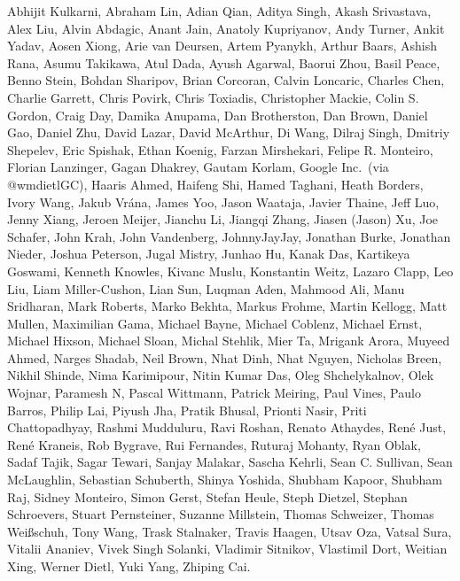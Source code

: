Abhijit Kulkarni,
Abraham Lin,
Adian Qian,
Aditya Singh,
Akash Srivastava,
Alex Liu,
Alvin Abdagic,
Anant Jain,
Anatoly Kupriyanov,
Andy Turner,
Ankit Yadav,
Aosen Xiong,
Arie van Deursen,
Artem Pyanykh,
Arthur Baars,
Ashish Rana,
Asumu Takikawa,
Atul Dada,
Ayush Agarwal,
Baorui Zhou,
Basil Peace,
Benno Stein,
Bohdan Sharipov,
Brian Corcoran,
Calvin Loncaric,
Charles Chen,
Charlie Garrett,
Chris Povirk,
Chris Toxiadis,
Christopher Mackie,
Colin S. Gordon,
Craig Day,
Damika Anupama,
Dan Brotherston,
Dan Brown,
Daniel Gao,
Daniel Zhu,
David Lazar,
David McArthur,
Di Wang,
Dilraj Singh,
Dmitriy Shepelev,
Eric Spishak,
Ethan Koenig,
Farzan Mirshekari,
Felipe R. Monteiro,
Florian Lanzinger,
Gagan Dhakrey,
Gautam Korlam,
Google Inc.\ (via @wmdietlGC),
Haaris Ahmed,
Haifeng Shi,
Hamed Taghani,
Heath Borders,
Ivory Wang,
Jakub Vr\'ana,
James Yoo,
Jason Waataja,
Javier Thaine,
Jeff Luo,
Jenny Xiang,
Jeroen Meijer,
Jianchu Li,
Jiangqi Zhang,
Jiasen (Jason) Xu,
Joe Schafer,
John Krah,
John Vandenberg,
JohnnyJayJay,
Jonathan Burke,
Jonathan Nieder,
Joshua Peterson,
Jugal Mistry,
Junhao Hu,
Kanak Das,
Kartikeya Goswami,
Kenneth Knowles,
Kivanc Muslu,
Konstantin Weitz,
Lazaro Clapp,
Leo Liu,
Liam Miller-Cushon,
Lian Sun,
Luqman Aden,
Mahmood Ali,
Manu Sridharan,
Mark Roberts,
Marko Bekhta,
Markus Frohme,
Martin Kellogg,
Matt Mullen,
Maximilian Gama,
Michael Bayne,
Michael Coblenz,
Michael Ernst,
Michael Hixson,
Michael Sloan,
Michal Stehlik,
Mier Ta,
Mrigank Arora,
Muyeed Ahmed,
Narges Shadab,
Neil Brown,
Nhat Dinh,
Nhat Nguyen,
Nicholas Breen,
Nikhil Shinde,
Nima Karimipour,
Nitin Kumar Das,
Oleg Shchelykalnov,
Olek Wojnar,
Paramesh N,
Pascal Wittmann,
Patrick Meiring,
Paul Vines,
Paulo Barros,
Philip Lai,
Piyush Jha,
Pratik Bhusal,
Prionti Nasir,
Priti Chattopadhyay,
Rashmi Mudduluru,
Ravi Roshan,
Renato Athaydes,
Ren\'e Just,
Ren\'e Kraneis,
Rob Bygrave,
Rui Fernandes,
Ruturaj Mohanty,
Ryan Oblak,
Sadaf Tajik,
Sagar Tewari,
Sanjay Malakar,
Sascha Kehrli,
Sean C. Sullivan,
Sean McLaughlin,
Sebastian Schuberth,
Shinya Yoshida,
Shubham Kapoor,
Shubham Raj,
Sidney Monteiro,
Simon Gerst,
Stefan Heule,
Steph Dietzel,
Stephan Schroevers,
Stuart Pernsteiner,
Suzanne Millstein,
Thomas Schweizer,
Thomas Wei\ss schuh,
Tony Wang,
Trask Stalnaker,
Travis Haagen,
Utsav Oza,
Vatsal Sura,
Vitalii Ananiev,
Vivek Singh Solanki,
Vladimir Sitnikov,
Vlastimil Dort,
Weitian Xing,
Werner Dietl,
Yuki Yang,
Zhiping Cai.

